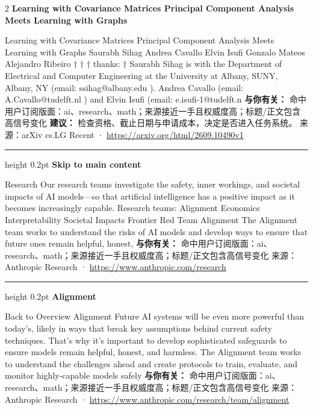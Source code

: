 \documentclass[10.5pt]{ctexart}
\begin{document}
\begin{multicols}{2}
{\large\bfseries Learning with Covariance Matrices Principal Component Analysis Meets Learning with Graphs}\par
Learning with Covariance Matrices Principal Component Analysis Meets Learning with Graphs Saurabh Sihag Andrea Cavallo Elvin Isufi Gonzalo Mateos Alejandro Ribeiro † † † thanks: † Saurabh Sihag is with the Department of Electrical and Computer Engineering at the University at Albany, SUNY, Albany, NY (email: ssihag@albany.edu ). Andrea Cavallo (email: A.Cavallo@tudelft.nl ) and Elvin Isufi (email: e.isufi-1@tudelft.n
\textbf{与你有关：} 命中用户订阅版面：ai、research、math；来源接近一手且权威度高；标题/正文包含高信号变化
\textbf{建议：} 检查资格、截止日期与申请成本，决定是否进入任务系统。
{\footnotesize\color{ormuted} 来源：arXiv cs.LG Recent · \url{https://arxiv.org/html/2609.10490v1}}
\vspace{2mm}
\hrule height 0.2pt
\vspace{2mm}
{\large\bfseries Skip to main content}\par
Research Our research teams investigate the safety, inner workings, and societal impacts of AI models—so that artificial intelligence has a positive impact as it becomes increasingly capable. Research teams: Alignment Economics Interpretability Societal Impacts Frontier Red Team Alignment The Alignment team works to understand the risks of AI models and develop ways to ensure that future ones remain helpful, honest, 
\textbf{与你有关：} 命中用户订阅版面：ai、research、math；来源接近一手且权威度高；标题/正文包含高信号变化
{\footnotesize\color{ormuted} 来源：Anthropic Research · \url{https://www.anthropic.com/research}}
\vspace{2mm}
\hrule height 0.2pt
\vspace{2mm}
{\large\bfseries Alignment}\par
Back to Overview Alignment Future AI systems will be even more powerful than today’s, likely in ways that break key assumptions behind current safety techniques. That’s why it’s important to develop sophisticated safeguards to ensure models remain helpful, honest, and harmless. The Alignment team works to understand the challenges ahead and create protocols to train, evaluate, and monitor highly-capable models safely
\textbf{与你有关：} 命中用户订阅版面：ai、research、math；来源接近一手且权威度高；标题/正文包含高信号变化
{\footnotesize\color{ormuted} 来源：Anthropic Research · \url{https://www.anthropic.com/research/team/alignment}}
\vspace{2mm}

\end{multicols}
\end{document}
